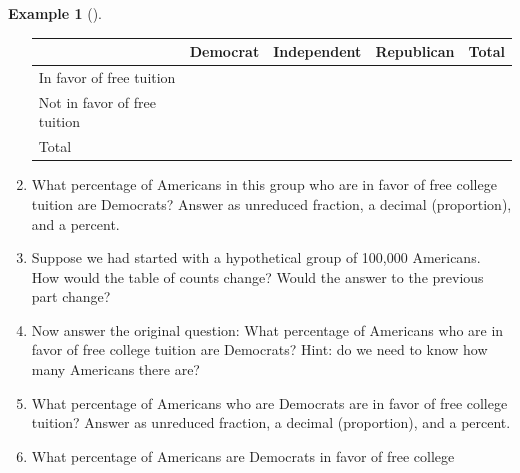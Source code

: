 \documentclass[
  letterpaper,
  DIV=11,
  numbers=noendperiod]{scrreprt}
\theoremstyle{plain}
\theoremstyle{definition}
\newtheorem{example}{Example}[chapter]
\theoremstyle{definition}
\theoremstyle{definition}
\theoremstyle{remark}
\begin{document}
\begin{tcolorbox}[enhanced jigsaw, opacityback=0, left=2mm, colframe=quarto-callout-note-color-frame, toprule=.15mm, breakable, colback=white, leftrule=.75mm, arc=.35mm, rightrule=.15mm, bottomrule=.15mm]
\begin{example}[]
\begin{enumerate}
  \begin{longtable}[]{@{}
    >{\raggedright\arraybackslash}p{}
    >{\raggedleft\arraybackslash}p{}
    >{\raggedleft\arraybackslash}p{}
    >{\raggedleft\arraybackslash}p{}
    >{\raggedleft\arraybackslash}p{}@{}}
  \toprule\noalign{}
  \begin{minipage}[b]{\linewidth}\raggedright
  \end{minipage} & \begin{minipage}[b]{\linewidth}\raggedleft
  Democrat
  \end{minipage} & \begin{minipage}[b]{\linewidth}\raggedleft
  Independent
  \end{minipage} & \begin{minipage}[b]{\linewidth}\raggedleft
  Republican
  \end{minipage} & \begin{minipage}[b]{\linewidth}\raggedleft
  Total
  \end{minipage} \\
  \midrule\noalign{}
  \endhead
  \bottomrule\noalign{}
  \endlastfoot
  In favor of free tuition & & & & \\
  Not in favor of free tuition & & & & \\
  Total & & & & 10000 \\
  \end{longtable}
\item
  What percentage of Americans in this group who are in favor of free
  college tuition are Democrats? Answer as unreduced fraction, a decimal
  (proportion), and a percent.
\item
  Suppose we had started with a hypothetical group of 100,000 Americans.
  How would the table of counts change? Would the answer to the previous
  part change?
\item
  Now answer the original question: What percentage of Americans who are
  in favor of free college tuition are Democrats? Hint: do we need to
  know how many Americans there are?
\item
  What percentage of Americans who are Democrats are in favor of free
  college tuition? Answer as unreduced fraction, a decimal (proportion),
  and a percent.
\item
  What percentage of Americans are Democrats in favor of free college

\end{enumerate}
\end{example}
\end{tcolorbox}
\end{document}
